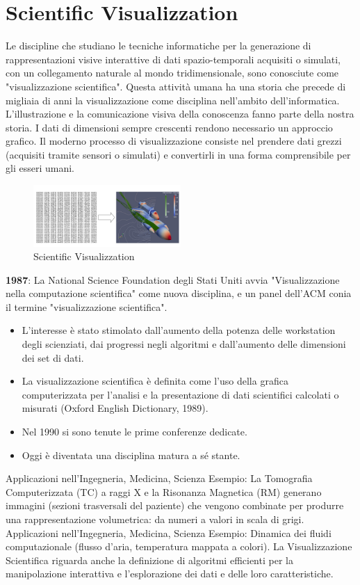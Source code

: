 \section{Scientific Visualizzation}
Le discipline che studiano le tecniche informatiche per la generazione di rappresentazioni visive interattive di dati spazio-temporali acquisiti o simulati, con un collegamento naturale al mondo tridimensionale, sono conosciute come "visualizzazione scientifica". Questa attività umana ha una storia che precede di migliaia di anni la visualizzazione come disciplina nell'ambito dell'informatica.
L'illustrazione e la comunicazione visiva della conoscenza fanno parte della nostra storia.
I dati di dimensioni sempre crescenti rendono necessario un approccio grafico. Il moderno processo di visualizzazione consiste nel prendere dati grezzi (acquisiti tramite sensori o simulati) e convertirli in una forma comprensibile per gli esseri umani.
\begin{figure}[H]
    \centering
    \includegraphics[width=0.5\textwidth]{images/Scient1.png} 
    \caption{Scientific Visualizzation}
    \label{fig:immagine}
\end{figure}
\textbf{1987}: La National Science Foundation degli Stati Uniti avvia "Visualizzazione nella computazione scientifica" come nuova disciplina, e un panel dell'ACM conia il termine "visualizzazione scientifica".
\begin{itemize}
    \item L'interesse è stato stimolato dall'aumento della potenza delle workstation degli scienziati, dai progressi negli algoritmi e dall'aumento delle dimensioni dei set di dati.
    \item La visualizzazione scientifica è definita come l'uso della grafica computerizzata per l'analisi e la presentazione di dati scientifici calcolati o misurati (Oxford English Dictionary, 1989).
    \item Nel 1990 si sono tenute le prime conferenze dedicate.
    \item Oggi è diventata una disciplina matura a sé stante.
\end{itemize}
Applicazioni nell'Ingegneria, Medicina, Scienza
Esempio:
La Tomografia Computerizzata (TC) a raggi X e la Risonanza Magnetica (RM) generano immagini (sezioni trasversali del paziente) che vengono combinate per produrre una rappresentazione volumetrica: da numeri a valori in scala di grigi.
Applicazioni nell'Ingegneria, Medicina, Scienza
Esempio: Dinamica dei fluidi computazionale (flusso d'aria, temperatura mappata a colori).
La Visualizzazione Scientifica riguarda anche la definizione di algoritmi efficienti per la manipolazione interattiva e l'esplorazione dei dati e delle loro caratteristiche.
